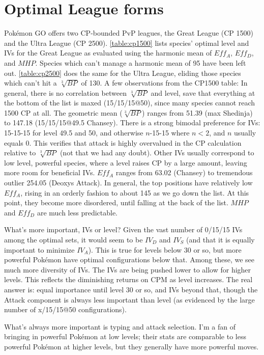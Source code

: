 \section{Optimal League forms}
Pokémon GO offers two CP-bounded PvP leagues, the Great League (CP 1500) and
   the Ultra League (CP 2500).
\autoref{table:cp1500} lists species' optimal level and IVs for the Great League
  as evaluated using the harmonic mean of $Eff_A$, $Eff_D$, and $MHP$.
Species which can't manage a harmonic mean of 95 have been left out.
\autoref{table:cp2500} does the same for the Ultra League, eliding those species which
  can't hit a $\sqrt[3]{BP}$ of 130.
A few observations from the CP1500 table:
In general, there is no correlation between $\sqrt[3]{BP}$ and level,
  save that everything at the bottom of the list is maxed (15/15/15@50),
  since many species cannot reach 1500 CP at all.
The geometric mean ($\sqrt[3]{BP}$) ranges from 51.39 (max Shedinja)
  to 147.18 (15/15/15@49.5 Chansey).
There is a strong bimodal preference for IVs: 15-15-15 for level 49.5
  and 50, and otherwise $n$-15-15 where $n < 2$, and $n$ usually equals 0.
This verifies that attack is highly overvalued in the CP calculation
  relative to $\sqrt[3]{BP}$ (not that we had any doubt).
Other IVs usually correspond to low level, powerful species, where a level
  raises CP by a large amount, leaving more room for beneficial IVs.
$Eff_A$ ranges from 63.02 (Chansey) to tremendous outlier 254.05 (Deoxys Attack).
In general, the top positions have relatively low $Eff_A$, rising in an
  orderly fashion to about 145 as we go down the list.
At this point, they become more disordered, until falling at the back
  of the list.
$MHP$ and $Eff_D$ are much less predictable.

What's more important, IVs or level?
Given the vast number of 0/15/15 IVs among the optimal sets, it
  would seem to be $IV_D$ and $IV_S$ (and that it is equally
  important to minimize $IV_A$).
This is true for levels below 30 or so, but more powerful Pokémon
  have optimal configurations below that.
Among these, we see much more diversity of IVs.
The IVs are being pushed lower to allow for higher levels.
This reflects the diminishing returns on CPM as level increases.
The real answer is: equal importance until level 30 or so, and IVs beyond that,
  though the Attack component is always less important than level
  (as evidenced by the large number of x/15/15@50 configurations).

What's always more important is typing and attack selection.
I'm a fan of bringing in powerful Pokémon at low levels; their stats are
  comparable to less powerful Pokémon at higher levels, but they
  generally have more powerful moves.

